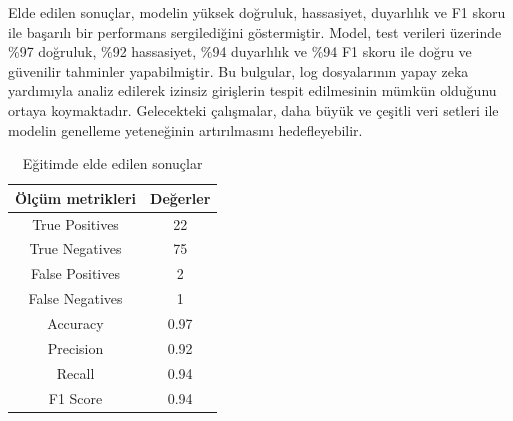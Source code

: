 \documentclass[12pt,a4paper]{article}
\begin{document}
Elde edilen sonuçlar, modelin yüksek doğruluk, hassasiyet, duyarlılık ve F1 skoru ile başarılı bir performans sergilediğini göstermiştir. Model, test verileri üzerinde \%97 doğruluk, \%92 hassasiyet, \%94 duyarlılık ve \%94 F1 skoru ile doğru ve güvenilir tahminler yapabilmiştir. Bu bulgular, log dosyalarının yapay zeka yardımıyla analiz edilerek izinsiz girişlerin tespit edilmesinin mümkün olduğunu ortaya koymaktadır. Gelecekteki çalışmalar, daha büyük ve çeşitli veri setleri ile modelin genelleme yeteneğinin artırılmasını hedefleyebilir.

\begin{table}[!htbp]
    \centering
    \caption{Eğitimde elde edilen sonuçlar}
    \begin{tabular}{|c|c|}
    \hline
    \textbf{Ölçüm metrikleri} & \textbf{Değerler} \\
    \hline
    True Positives & 22 \\
    \hline
    True Negatives & 75 \\
    \hline
    False Positives & 2 \\
    \hline
    False Negatives & 1 \\
    \hline
    Accuracy & 0.97 \\
    \hline
    Precision & 0.92 \\
    \hline
    Recall & 0.94 \\
    \hline
    F1 Score & 0.94 \\
    \hline
    \end{tabular}
\end{table}



\end{document}
